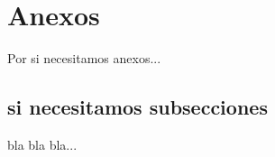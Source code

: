\chapter{Anexos}

Por si necesitamos anexos...
 
\section{si necesitamos subsecciones}

bla bla bla...
